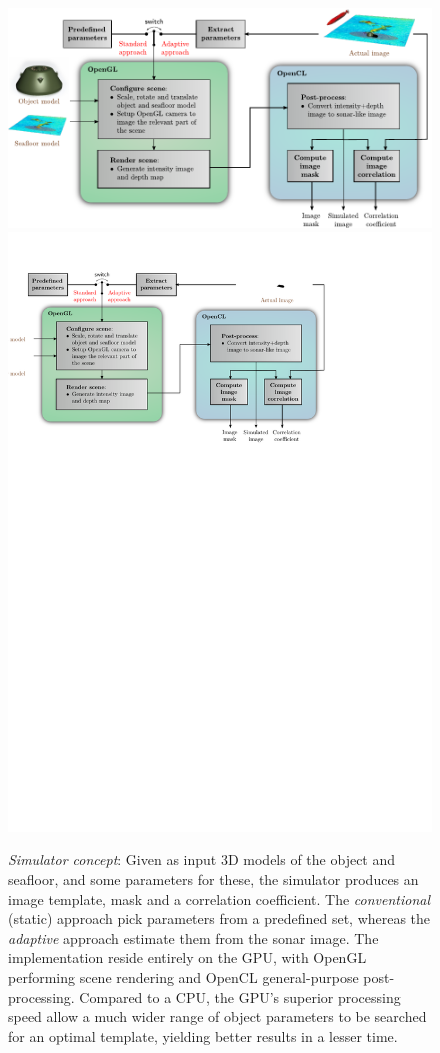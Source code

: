 \begin{figure}[t]\centering%
\ifOverLeaf%
  \includegraphics[width=\linewidth]{gfx/simulator.pdf}%
\else
  \includegraphics[drawing,width=\linewidth]{gfx/simulator.svg}%
\fi
\caption{\emph{Simulator concept}: Given as input 3D models of the object and seafloor, and some parameters for these, the simulator produces an image template, mask and a correlation coefficient. The \emph{conventional} (static) approach pick parameters from a predefined set, whereas the \emph{adaptive} approach estimate them from the sonar image. The implementation reside entirely on the GPU, with OpenGL performing scene rendering and OpenCL general-purpose post-processing. Compared to a CPU, the GPU's superior processing speed allow a much wider range of object parameters to be searched for an optimal template, yielding better results in a lesser time.}\label{IV_buildup}%
\end{figure}

